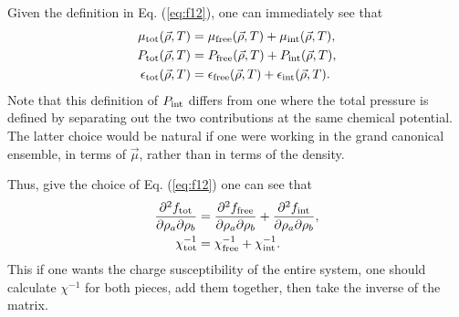 \documentclass[12pt]{article}
\numberwithin{equation}{section}
\numberwithin{figure}{section}
\begin{document}
Given the definition in Eq. (\ref{eq:f12}), one can immediately see that
\begin{align*}
\mu_{\rm tot}(\vec{\rho},T)&=\mu_{\rm free}(\vec{\rho},T)+\mu_{\rm int}(\vec{\rho},T),\\
P_{\rm tot}(\vec{\rho},T)&=P_{\rm free}(\vec{\rho},T)+P_{\rm int}(\vec{\rho},T),\\
\epsilon_{\rm tot}(\vec{\rho},T)&=\epsilon_{\rm free}(\vec{\rho},T)+\epsilon_{\rm int}(\vec{\rho},T).
\end{align*}
Note that this definition of $P_{\rm int}$ differs from one where the total pressure is defined by separating out the two contributions at the same chemical potential. The latter choice would be natural if one were working in the grand canonical ensemble, in terms of $\vec{\mu}$, rather than in terms of the density.

Thus, give the choice of Eq. (\ref{eq:f12}) one can see that
\begin{align*}
\frac{\partial^2f_{\rm tot}}{\partial\rho_a\partial\rho_b}&=
\frac{\partial^2f_{\rm free}}{\partial\rho_a\partial\rho_b}+\frac{\partial^2f_{\rm int}}{\partial\rho_a\partial\rho_b},\\
\chi^{-1}_{\rm tot}&=\chi^{-1}_{\rm free}+\chi^{-1}_{\rm int}.
\end{align*}
This if one wants the charge susceptibility of the entire system, one should calculate $\chi^{-1}$ for both pieces, add them together, then take the inverse of the matrix.
\end{document}
